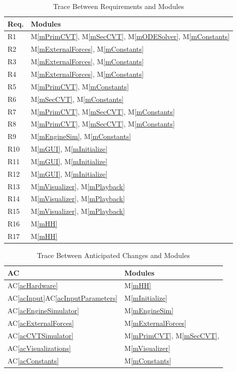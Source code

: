 \documentclass[12pt, titlepage]{article}
\newcommand{\acref}[1]{AC\ref{#1}}
\newcommand{\mref}[1]{M\ref{#1}}
\begin{document}
\begin{table}[H]
\centering
\begin{tabular}{p{} p{}}
\toprule
\textbf{Req.} & \textbf{Modules}\\
\midrule
R1 & \mref{mPrimCVT}, \mref{mSecCVT}, \mref{mODESolver}, \mref{mConstants}\\
R2 & \mref{mExternalForces}, \mref{mConstants}\\
R3 & \mref{mExternalForces}, \mref{mConstants}\\
R4 & \mref{mExternalForces}, \mref{mConstants}\\
R5 & \mref{mPrimCVT}, \mref{mConstants}\\
R6 & \mref{mSecCVT}, \mref{mConstants}\\
R7 & \mref{mPrimCVT}, \mref{mSecCVT}, \mref{mConstants}\\
R8 & \mref{mPrimCVT}, \mref{mSecCVT}, \mref{mConstants}\\
R9 & \mref{mEngineSim}, \mref{mConstants}\\
R10 & \mref{mGUI}, \mref{mInitialize}\\
R11 & \mref{mGUI}, \mref{mInitialize}\\
R12 & \mref{mGUI}, \mref{mInitialize}\\
R13 & \mref{mVisualizer}, \mref{mPlayback}\\
R14 & \mref{mVisualizer}, \mref{mPlayback}\\
R15 & \mref{mVisualizer}, \mref{mPlayback}\\
R16 & \mref{mHH}\\
R17 & \mref{mHH}\\
\bottomrule
\end{tabular}
\caption{Trace Between Requirements and Modules}
\label{TblRT}
\end{table}

\begin{table}[H]
\centering
\begin{tabular}{p{} p{}}
\toprule
\textbf{AC} & \textbf{Modules}\\
\midrule
\acref{acHardware} & \mref{mHH}\\
\acref{acInput}\acref{acInputParameters} & \mref{mInitialize}\\
\acref{acEngineSimulator} & \mref{mEngineSim}\\
\acref{acExternalForces} & \mref{mExternalForces}\\
\acref{acCVTSimulator} & \mref{mPrimCVT}, \mref{mSecCVT},\\
\acref{acVisualizations} & \mref{mVisualizer}\\
\acref{acConstants} & \mref{mConstants}\\

\bottomrule
\end{tabular}
\caption{Trace Between Anticipated Changes and Modules}
\label{TblACT}
\end{table}
\end{document}
